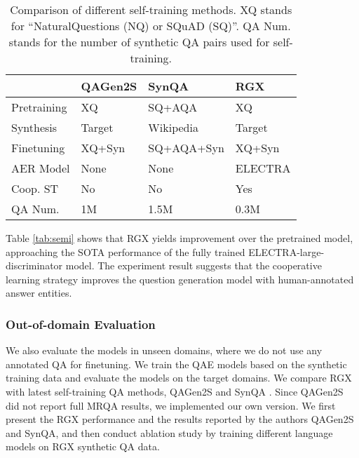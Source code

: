 \documentclass[11pt,a4paper]{article}
\begin{document}
\begin{table*}[t]
\begin{tabular}{@{}lllllllllllllll@{}}
\bottomrule
\end{tabular}
\caption{The QA performance evaluation on the out-of-domains of the MRQA benchmark. All models used are pretrained on the human-labeled training set from the source domains, and the QA models are finetuned on synthetic data generated based on the unannotated passages of the target domains. The finetuned QA models are evaluated on human-generated evaluation data for each target domains with the exact match (EM) and F1 scores. MMI stands for maximum mutual information inference, EM stands for involving difficult questions with EM selection, and CST stands for cooperative self-training.}
\label{tab:mrqa}
\end{table*}

\begin{table}[]
\small
\begin{tabular}{@{}llll@{}}
\toprule
                   & \textbf{QAGen2S}   & \textbf{SynQA}         & \textbf{RGX}           \\ \midrule
Pretraining & XQ     & SQ+AQA        & XQ         \\
Synthesis   & Target    & Wikipedia     & Target        \\
Finetuning    & XQ+Syn    & SQ+AQA+Syn     & XQ+Syn        \\
AER Model          & None      & None          & ELECTRA       \\
Coop. ST & No        & No            & Yes           \\
QA Num.       & 1M        & 1.5M          & 0.3M          \\ \bottomrule
\end{tabular}
\caption{Comparison of different self-training methods. XQ stands for ``NaturalQuestions (NQ) or SQuAD (SQ)''. QA Num. stands for the number of synthetic QA pairs used for self-training.}
\label{tab:comp}
\end{table}


Table \ref{tab:semi} shows that RGX yields improvement over the pretrained model, approaching the SOTA performance of the fully trained ELECTRA-large-discriminator model. The experiment result suggests that the cooperative learning strategy improves the question generation model with human-annotated answer entities.



\subsubsection{Out-of-domain Evaluation}
We also evaluate the models in unseen domains, where we do not use any annotated QA for finetuning. We train the QAE models based on the synthetic training data and evaluate the models on the target domains. We compare RGX with latest self-training QA methods, QAGen2S \cite{shakeri2020end} and SynQA \cite{bartolo2021improving}. Since QAGen2S did not report full MRQA results, we implemented our own version. We first present the RGX performance and the results reported by the authors QAGen2S and SynQA, and then conduct ablation study by training different language models on RGX synthetic QA data.
\end{document}
